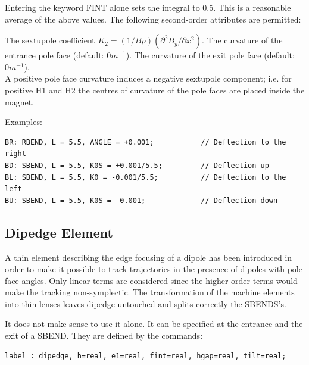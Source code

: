 Entering the keyword FINT alone sets the integral to 0.5. This is a
reasonable average of the above values.  The following second-order
attributes are permitted:  
\begin{madlist}
     The sextupole coefficient 
    $K_2 = (1 / B \rho) (\partial^2 B_y / \partial x^2)$.   
     The curvature of the entrance pole face 
    (default: $0 m^{-1}$).  
     The curvature of the exit pole face 
    (default: $0 m^{-1}$). \\ 
    A positive pole face curvature induces a negative sextupole
    component; i.e. for positive H1 and H2 the centres of curvature of
    the pole faces are placed inside the magnet. 
\end{madlist} 

Examples: 
\begin{verbatim}
BR: RBEND, L = 5.5, ANGLE = +0.001;           // Deflection to the right
BD: SBEND, L = 5.5, K0S = +0.001/5.5;         // Deflection up
BL: SBEND, L = 5.5, K0 = -0.001/5.5;          // Deflection to the left
BU: SBEND, L = 5.5, K0S = -0.001;             // Deflection down
\end{verbatim}


%
\subsection{Dipedge Element}
A thin element describing the edge focusing of a dipole has been
introduced in order to make it possible to track trajectories in the
presence of dipoles with pole face angles. Only linear terms are
considered since the higher order terms would make the tracking
non-symplectic. The transformation of the machine elements into thin
lenses leaves dipedge untouched and splits correctly the SBENDS's.  

It does not make sense to use it alone. It can be specified at the
entrance and the exit of a SBEND. They are defined by the commands:  
\begin{verbatim}
label : dipedge, h=real, e1=real, fint=real, hgap=real, tilt=real;
\end{verbatim} 

